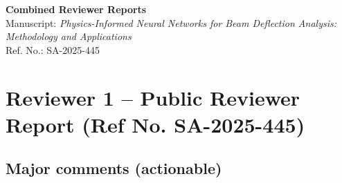 \documentclass[11pt]{article}
\begin{document}
\begin{center}
    \LARGE\textbf{Combined Reviewer Reports}\\[6pt]
    \large Manuscript: \textit{Physics-Informed Neural Networks for Beam Deflection Analysis: Methodology and Applications}\\
    \normalsize Ref. No.: SA-2025-445
\end{center}

\vspace{12pt}

\section*{Reviewer 1 -- Public Reviewer Report (Ref No. SA-2025-445)}

\subsection*{Major comments (actionable)}
\end{document}
